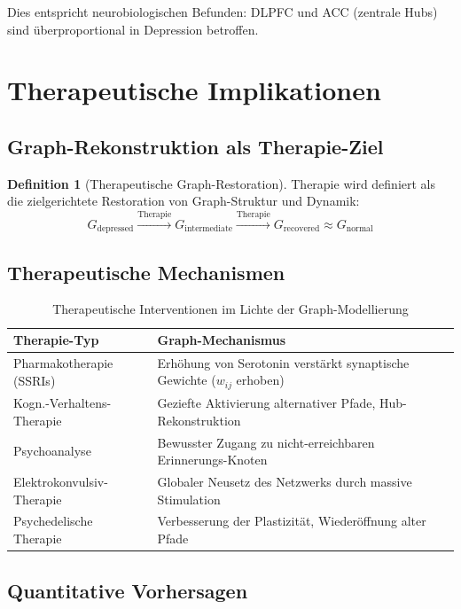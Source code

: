 \documentclass[a4paper,12pt]{article}
\theoremstyle{definition}
\newtheorem{definition}{Definition}
\begin{document}
Dies entspricht neurobiologischen Befunden: DLPFC und ACC (zentrale Hubs) sind überproportional in Depression betroffen.

\section{Therapeutische Implikationen}

\subsection{Graph-Rekonstruktion als Therapie-Ziel}

\begin{definition}[Therapeutische Graph-Restoration]
Therapie wird definiert als die zielgerichtete Restoration von Graph-Struktur und Dynamik:
\[
G_{\text{depressed}} \xrightarrow{\text{Therapie}} G_{\text{intermediate}} \xrightarrow{\text{Therapie}} G_{\text{recovered}} \approx G_{\text{normal}}
\]
\end{definition}

\subsection{Therapeutische Mechanismen}

\begin{table}[h]
\centering
\begin{tabular}{lp{8cm}}
\toprule
\textbf{Therapie-Typ} & \textbf{Graph-Mechanismus} \\
\midrule
Pharmakotherapie (SSRIs) & Erhöhung von Serotonin verstärkt synaptische Gewichte ($w_{ij}$ erhoben) \\
Kogn.-Verhaltens-Therapie & Geziefte Aktivierung alternativer Pfade, Hub-Rekonstruktion \\
Psychoanalyse & Bewusster Zugang zu nicht-erreichbaren Erinnerungs-Knoten \\
Elektrokonvulsiv-Therapie & Globaler Neusetz des Netzwerks durch massive Stimulation \\
Psychedelische Therapie & Verbesserung der Plastizität, Wiederöffnung alter Pfade \\
\bottomrule
\end{tabular}
\caption{Therapeutische Interventionen im Lichte der Graph-Modellierung}
\label{tab:therapies}
\end{table}

\subsection{Quantitative Vorhersagen}
\end{document}
